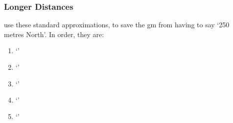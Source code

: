 \begin{multicols}{2}
\subsubsection{Longer Distances}
use these standard approximations, to save the \gls{gm} from having to say `250 metres North'.
In order, they are:

\begin{multicols}{2}
  \begin{enumerate}
    \item
    \toggletrue{Distant}
    \setcounter{spellCost}{2}
    \setRange{}
    `\spellRange'
    \item
    \setRange{}
    `\spellRange'
    \item
    \setRange{}
    `\spellRange'
    \item
    \setRange{}
    `\spellRange'
    \item
    \setRange{}
    `\spellRange'
  \end{enumerate}
\end{multicols}

%

\end{multicols}

